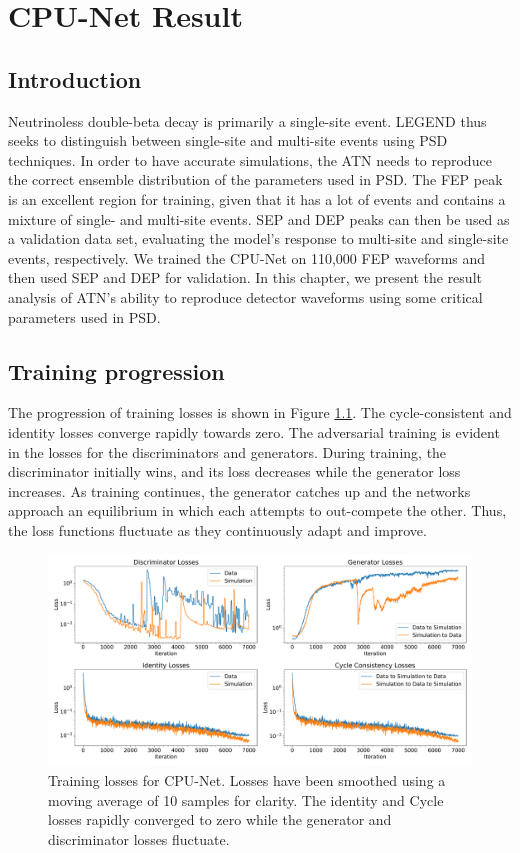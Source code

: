 \chapter{CPU-Net Result}\label{chap:cpu-net_result}

\section{Introduction}

Neutrinoless double-beta decay is primarily a single-site event. LEGEND thus seeks to distinguish between single-site and multi-site events using PSD techniques. In order to have accurate simulations, the ATN needs to reproduce the correct ensemble distribution of the parameters used in PSD. The FEP peak is an excellent region for training, given that it has a lot of events and contains a mixture of single- and multi-site events. SEP and DEP peaks can then be used as a validation data set, evaluating the model's response to multi-site and single-site events, respectively. We trained the CPU-Net on 110,000 FEP waveforms and then used SEP and DEP for validation. In this chapter, we present the result analysis of ATN's ability to reproduce detector waveforms using some critical parameters used in PSD. 


\section{Training progression}
The progression of training losses is shown in Figure \ref{fig:training_loss}. The cycle-consistent and identity losses converge rapidly towards zero. The adversarial training is evident in the losses for the discriminators and generators. During training, the discriminator initially wins, and its loss decreases while the generator loss increases. As training continues, the generator catches up and the networks approach an equilibrium in which each attempts to out-compete the other. Thus, the loss functions fluctuate as they continuously adapt and improve.


\begin{figure}%
    \includegraphics[width=0.99\linewidth]{ch8/figs/loss_funcs.pdf}
    \caption{Training losses for CPU-Net. Losses have been smoothed using a moving average of 10 samples for clarity. The identity and Cycle losses rapidly converged to zero while the generator and discriminator losses fluctuate.} 
   \label{fig:training_loss}
\end{figure}

